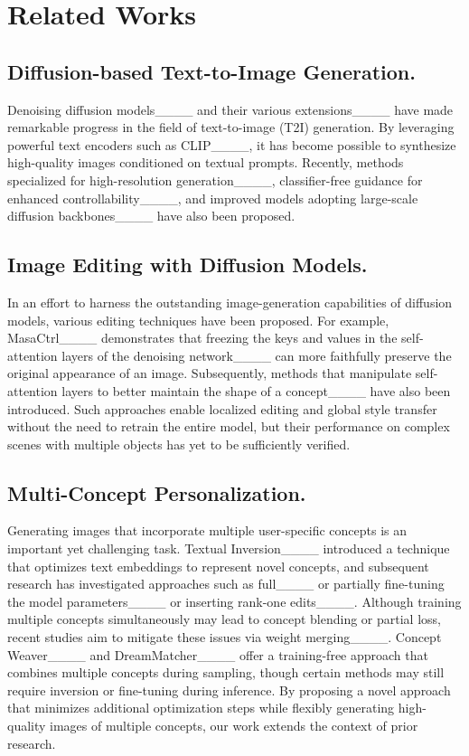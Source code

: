 \section{Related Works}
\subsection{Diffusion-based Text-to-Image Generation.}
Denoising diffusion models____ and their various extensions____ have made remarkable progress in the field of text-to-image (T2I) generation. 
By leveraging powerful text encoders such as CLIP____, it has become possible to synthesize high-quality images conditioned on textual prompts. 
Recently, methods specialized for high-resolution generation____, classifier-free guidance for enhanced controllability____, and improved models adopting large-scale diffusion backbones____ have also been proposed.

\subsection{Image Editing with Diffusion Models.}
In an effort to harness the outstanding image-generation capabilities of diffusion models, various editing techniques have been proposed. 
For example, MasaCtrl____ demonstrates that freezing the keys and values in the self-attention layers of the denoising network____ can more faithfully preserve the original appearance of an image. 
Subsequently, methods that manipulate self-attention layers to better maintain the shape of a concept____ have also been introduced. 
Such approaches enable localized editing and global style transfer without the need to retrain the entire model, but their performance on complex scenes with multiple objects has yet to be sufficiently verified.

\subsection{Multi-Concept Personalization.}
Generating images that incorporate multiple user-specific concepts is an important yet challenging task. 
Textual Inversion____ introduced a technique that optimizes text embeddings to represent novel concepts, and subsequent research has investigated approaches such as full____ or partially fine-tuning the model parameters____ or inserting rank-one edits____. 
Although training multiple concepts simultaneously may lead to concept blending or partial loss, recent studies aim to mitigate these issues via weight merging____. Concept Weaver____ and DreamMatcher____ offer a training-free approach that combines multiple concepts during sampling, though certain methods may still require inversion or fine-tuning during inference. 
By proposing a novel approach that minimizes additional optimization steps while flexibly generating high-quality images of multiple concepts, our work extends the context of prior research.